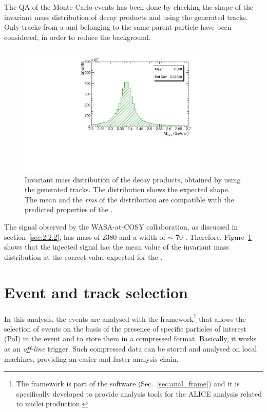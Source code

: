 The QA of the Monte Carlo events has been done by checking the shape of the invariant mass distribution
of \dst decay products and using the generated tracks. Only tracks from a \dst and belonging to the
same parent particle have been considered, in order to reduce the background. 

\begin{figure}
    \centering
    \includegraphics[width=0.8\textwidth]{gfx/valid}
	\caption{Invariant mass distribution of the \dst decay products, obtained by using the generated tracks. The distribution shows the expected shape. The mean and the \textit{rms} of the distribution are compatible with the predicted properties of the \dst.}
	\label{fig:valid}
\end{figure}

The signal observed by the WASA-at-COSY collaboration, as discussed in section~\ref{sec:2.2.2}, has
mass of 2380 \mevcs and a width of $\sim$ 70 \mevcs. Therefore, Figure~\ref{fig:valid} shows that the
injected signal has the mean value of the invariant mass distribution at the correct value expected
for the \dst.

%
%
\section{Event and track selection} \label{sec:4.2}

In this analysis, the events are analysed with the  framework\footnote{The  
framework is part of the  software (Sec.~\ref{sec:anal_frame}) and it is 
specifically developed to provide analysis tools for the ALICE analysis related to nuclei
production.} that allows the selection of events on the basis of the presence of specific particles 
of interest (PoI) in the event and to store them in a compressed format.
Basically, it works as an \textit{off-line} trigger.
Such compressed data can be stored and analysed on local machines, providing an easier and faster
analysis chain.

